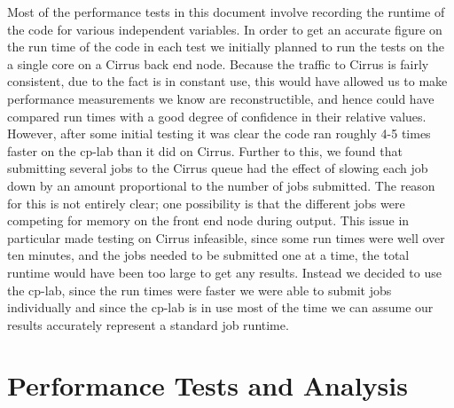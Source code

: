 Most of the performance tests in this document involve recording the runtime of the code for various independent variables. In order to get an accurate figure on the run time of the code in each test we initially planned to run the tests on the a single core on a Cirrus back end node. Because the traffic to Cirrus is fairly consistent, due to the fact is in constant use, this would have allowed us to make performance measurements we know are reconstructible, and hence could have compared run times with a good degree of confidence in their relative values. However, after some initial testing it was clear the code ran roughly 4-5 times faster on the cp-lab than it did on Cirrus. Further to this, we found that submitting several jobs to the Cirrus queue had the effect of slowing each job down by an amount proportional to the number of jobs submitted. The reason for this is not entirely clear; one possibility is that the different jobs were competing for memory on the front end node during output. This issue in particular made testing on Cirrus infeasible, since some run times were well over ten minutes, and the jobs needed to be submitted one at a time, the total runtime would have been too large to get any results. Instead we decided to use the cp-lab, since the run times were faster we were able to submit jobs individually and since the cp-lab is in use most of the time we can assume our results accurately represent a standard job runtime.

\section{Performance Tests and Analysis}
\label{sec:perf}

